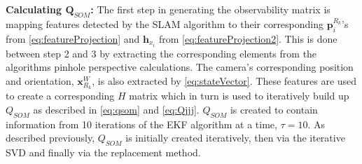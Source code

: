 \documentclass[10pt,twocolumn,letterpaper]{article}
\begin{document}
\textbf{Calculating $\boldsymbol{Q}_{SOM}$:} The first step in generating the observability matrix is mapping  features detected by the SLAM algorithm to their corresponding $\boldsymbol{p}_{i}^{R_k}$'s from \eqref{eq:featureProjection} and $\boldsymbol{h}_{x_i}$ from \eqref{eq:featureProjection2}. This is done between step 2 and 3 by extracting the corresponding elements from the algorithms pinhole perspective calculations. The camera's corresponding position and orientation, $\boldsymbol{x}_{R_k}^W$, is also extracted by  \eqref{eq:stateVector}. These features are used to create a corresponding $H$ matrix which in turn is used to iteratively build up $Q_{SOM}$ as described in \eqref{eq:qsom} and \eqref{eq:Qjjj}. $Q_{SOM}$ is created to contain information from 10 iterations of the EKF algorithm at a time, \ie $\tau = 10$. As described previously, $Q_{SOM}$ is initially created iteratively, then via the iterative SVD and finally via the replacement method.
  
\end{document}
